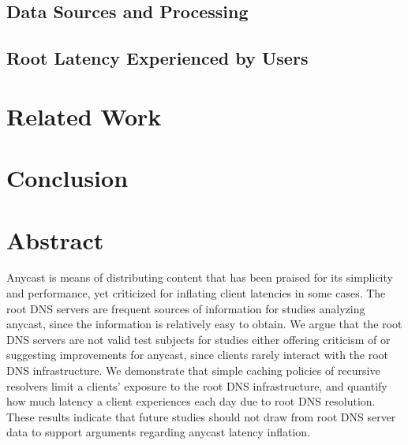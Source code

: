 \documentclass[sigconf,nonacm,10pt]{acmart}
\begin{document}
\subsection{Data Sources and
Processing}\label{data-sources-and-processing}

\subsection{Root Latency Experienced by
Users}\label{root-latency-experienced-by-users}

\section{Related Work}\label{related-work}

\section{Conclusion}\label{conclusion}

\fi

\section*{Abstract}\label{abstract-1}

Anycast is means of distributing content that has been praised for its
simplicity and performance, yet criticized for inflating client
latencies in some cases. The root DNS servers are frequent sources of
information for studies analyzing anycast, since the information is
relatively easy to obtain. We argue that the root DNS servers are not
valid test subjects for studies either offering criticism of or
suggesting improvements for anycast, since clients rarely interact with
the root DNS infrastructure. We demonstrate that simple caching policies
of recursive resolvers limit a clients' exposure to the root DNS
infrastructure, and quantify how much latency a client experiences each
day due to root DNS resolution. These results indicate that future
studies should not draw from root DNS server data to support arguments
regarding anycast latency inflation.
\end{document}
